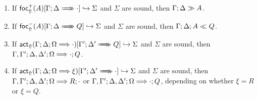 \begin{lemma}\label{bkwdder-soundness-lemma}
  \begin{enumerate}
  \item If $\brfrelj{A}{\bneuseq{\Gamma}{\Delta}{\cdot}}{\Sigma}$ and $\Sigma$
    are sound, then $\Gamma; \Delta \gg A$.
  \item If $\blfrelj{A}{\bneuseq{\Gamma}{\Delta}{Q}}{\Sigma}$ and $\Sigma$
    are sound, then $\Gamma; \Delta; A \ll Q$.
  \item If
    $\bactrelj{\btriseq{\Gamma}{\Delta}{\Omega}{\cdot}}{\bneuseq{\Gamma'}{\Delta'}{Q}}{\Sigma}$
    and $\Sigma$ are sound, then $\Gamma, \Gamma'; \Delta,
      \Delta'; \Omega \Longrightarrow \cdot ; Q$.
  \item If
    $\bactrelj{\btriseq{\Gamma}{\Delta}{\Omega}{\xi}}{\bneuseq{\Gamma'}{\Delta'}{\cdot}}{\Sigma}$
    and $\Sigma$ are sound, then
    $\Gamma, \Gamma'; \Delta, \Delta'; \Omega \Longrightarrow R ; \cdot$ or
    $\Gamma, \Gamma'; \Delta, \Delta'; \Omega \Longrightarrow \cdot ; Q$, depending
    on whether $\xi = R$ or $\xi = Q$.
  \end{enumerate}
\end{lemma}
